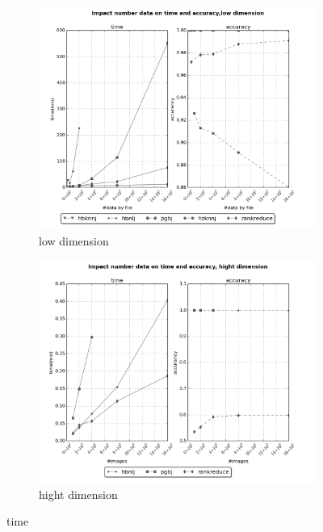 \documentclass[10pt,a4paper]{article}
\begin{document}
  \begin{figure}[ht]
  \centering
 	  \begin{subfigure}[b]{0.4\textwidth}
                 \includegraphics[width=\textwidth]{../graph/geo/time.png} 
                \caption{low dimension}
        \end{subfigure}%
        \begin{subfigure}[b]{0.4\textwidth}
                 \includegraphics[width=\textwidth]{../graph/surf/time.png} 
                \caption{hight dimension}
        \end{subfigure}%
        \caption{time}
  \end{figure}
   \newpage
\end{document}
